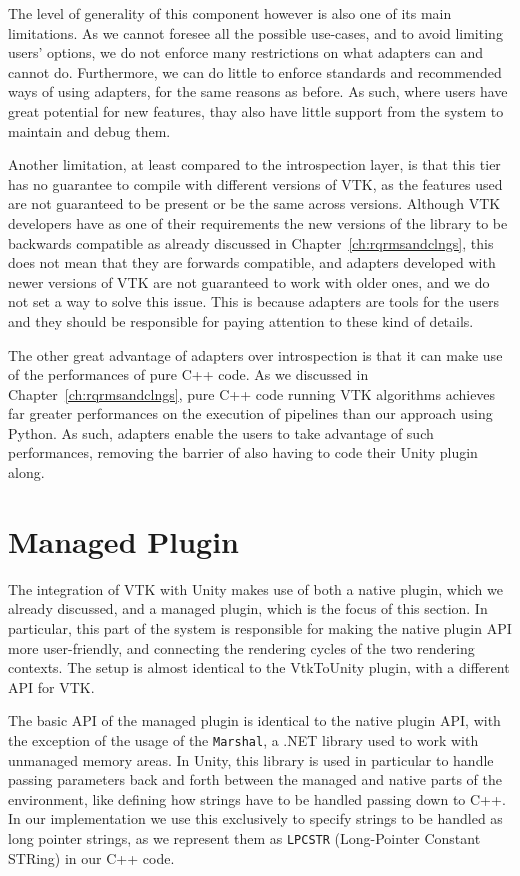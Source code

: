 The level of generality of this component however is also one of its main limitations. As we cannot foresee all the possible use-cases, and to avoid limiting users' options, we do not enforce many restrictions on what adapters can and cannot do. Furthermore, we can do little to enforce standards and recommended ways of using adapters, for the same reasons as before. As such, where users have great potential for new features, thay also have little support from the system to maintain and debug them.

Another limitation, at least compared to the introspection layer, is that this tier has no guarantee to compile with different versions of VTK, as the features used are not guaranteed to be present or be the same across versions. Although VTK developers have as one of their requirements the new versions of the library to be backwards compatible as already discussed in Chapter~\ref{ch:rqrmsandclngs}, this does not mean that they are forwards compatible, and adapters developed with newer versions of VTK are not guaranteed to work with older ones, and we do not set a way to solve this issue. This is because adapters are tools for the users and they should be responsible for paying attention to these kind of details.

The other great advantage of adapters over introspection is that it can make use of the performances of pure C++ code. As we discussed in Chapter~\ref{ch:rqrmsandclngs}, pure C++ code running VTK algorithms achieves far greater performances on the execution of pipelines than our approach using Python. As such, adapters enable the users to take advantage of such performances, removing the barrier of also having to code their Unity plugin along.

\section{Managed Plugin}
\label{sec:design-managed-plugin}

The integration of VTK with Unity makes use of both a native plugin, which we already discussed, and a managed plugin, which is the focus of this section. In particular, this part of the system is responsible for making the native plugin API more user-friendly, and connecting the rendering cycles of the two rendering contexts. The setup is almost identical to the VtkToUnity plugin, with a different API for VTK.

The basic API of the managed plugin is identical to the native plugin API, with the exception of the usage of the \verb|Marshal|, a .NET library used to work with unmanaged memory areas. In Unity, this library is used in particular to handle passing parameters back and forth between the managed and native parts of the environment, like defining how strings have to be handled passing down to C++. In our implementation we use this exclusively to specify strings to be handled as long pointer strings, as we represent them as \verb|LPCSTR| (Long-Pointer Constant STRing) in our C++ code.

